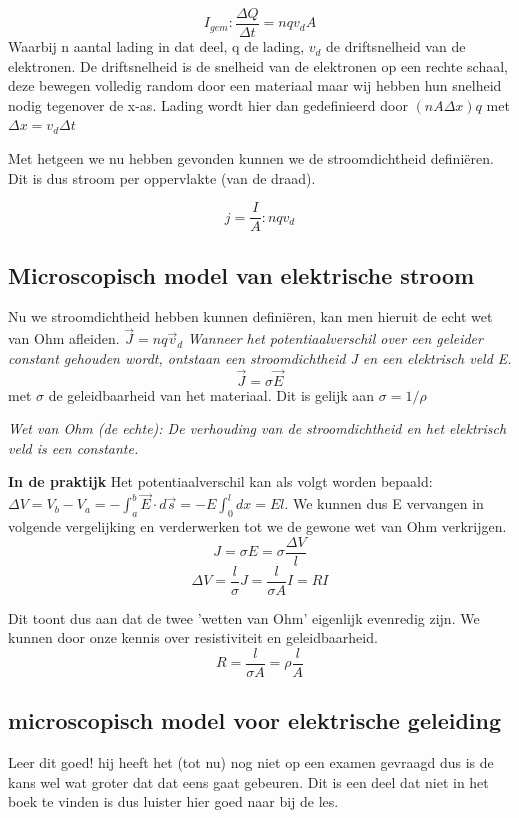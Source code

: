 \documentclass[12pt,a4paper]{article}
\begin{document}
    \[I_{gem} : \frac{\Delta Q}{\Delta t} = nqv_dA\]
    Waarbij n aantal lading in dat deel, q de lading, $v_d$ de driftsnelheid van de elektronen. De driftsnelheid is de snelheid van de elektronen op een rechte schaal, deze bewegen volledig random door een materiaal maar wij hebben hun snelheid nodig tegenover de x-as. Lading wordt hier dan gedefinieerd door \((nA\Delta x)q\) met \(\Delta x = v_d \Delta t\)
    
    Met hetgeen we nu hebben gevonden kunnen we de stroomdichtheid definiëren. Dit is dus stroom per oppervlakte (van de draad). 
    
    \[j = \frac{I}{A} : nqv_d\]
    
    \subsection{Microscopisch model van elektrische stroom}
    Nu we stroomdichtheid hebben kunnen definiëren, kan men hieruit de echt wet van Ohm afleiden. \(\vec{J} = nq\vec{v}_d\)
    \textit{Wanneer het potentiaalverschil over een geleider constant gehouden wordt, ontstaan een stroomdichtheid J en een elektrisch veld E.}
    \[\vec{J} = \sigma\vec{E}\]
    met $\sigma$ de geleidbaarheid van het materiaal. Dit is gelijk aan $\sigma = 1/\rho$
    
    \textit{Wet van Ohm (de echte): De verhouding van de stroomdichtheid en het elektrisch veld is een constante.}
    
    \textbf{In de praktijk}
    Het potentiaalverschil kan als volgt worden bepaald: \(\Delta V = V_b - V_a = -\int_a^b \vec{E}\cdot d\vec{s} = -E\int_0^ldx = El\).
    We kunnen dus E vervangen in volgende vergelijking en verderwerken tot we de gewone wet van Ohm verkrijgen.
    \[J = \sigma E = \sigma\frac{\Delta V}{l}\]
    \[\Delta V = \frac{l}{\sigma}J = \frac{l}{\sigma A}I = RI\]    
    
    Dit toont dus aan dat de twee 'wetten van Ohm' eigenlijk evenredig zijn. We kunnen door onze kennis over resistiviteit en geleidbaarheid. \[R = \frac{l}{\sigma A} = \rho\frac{l}{A}\]
    
    \subsection{microscopisch model voor elektrische geleiding}
    Leer dit goed! hij heeft het (tot nu) nog niet op een examen gevraagd dus is de kans wel wat groter dat dat eens gaat gebeuren. Dit is een deel dat niet in het boek te vinden is dus luister hier goed naar bij de les.
\end{document}
